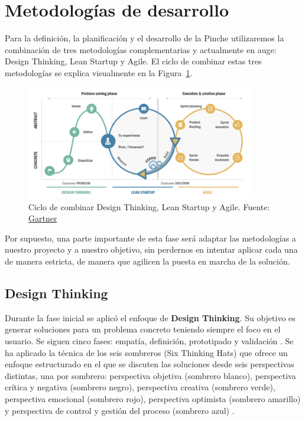 \section{Metodologías de desarrollo}

Para la definición, la planificación y el desarrollo de la Pinche utilizaremos la combinación de tres metodologías complementarias y actualmente en auge: Design Thinking, Lean Startup y Agile. El ciclo de combinar estas tres metodologías se explica visualmente en la Figura~\ref{fig:methodologies}.

\begin{figure}[H]
\centering
\includegraphics[width=0.9\textwidth]{./img/methodologies/methodologies.png}
\caption{Ciclo de combinar Design Thinking, Lean Startup y Agile.  Fuente: \href{https://www.gartner.com/en}{Gartner}}
\label{fig:methodologies}
\end{figure}

Por supuesto, una parte importante de esta fase será adaptar las metodologías a nuestro proyecto y a nuestro objetivo, sin perdernos en intentar aplicar cada una de manera estricta, de manera que agilicen la puesta en marcha de la solución.

\subsection{Design Thinking}

Durante la fase inicial se aplicó el enfoque de \textbf{Design Thinking}. Su objetivo es generar soluciones para un problema concreto teniendo siempre el foco en el usuario. Se siguen cinco fases: empatía, definición, prototipado y validación \cite{designthinking}. Se ha aplicado la técnica de los seis sombreros (Six Thinking Hats) que ofrece un enfoque estructurado en el que se discuten las soluciones desde seis perspectivas distintas, una por sombrero: perspectiva objetiva (sombrero blanco), perspectiva crítica y negativa (sombrero negro), perspectiva creativa (sombrero verde), perspectiva emocional (sombrero rojo), perspectiva optimista (sombrero amarillo) y perspectiva de control y gestión del proceso (sombrero azul) \cite{six-thinking-hats}.

